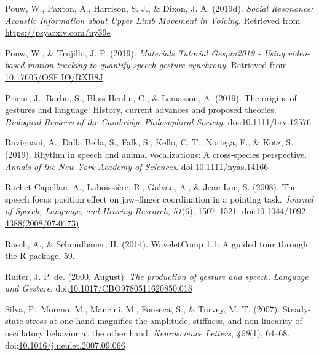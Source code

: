 \documentclass[
  man, noextraspace,floatsintext]{apa6}
\newlength{\cslhangindent}
\newenvironment{cslreferences}%
  {\setlength{\parindent}{0pt}%
  \everypar{\setlength{\hangindent}{\cslhangindent}}\ignorespaces}%
  {\par}
\begin{document}
\begin{cslreferences}
\leavevmode\hypertarget{ref-pouwSocialResonanceAcoustic2019}{}%
Pouw, W., Paxton, A., Harrison, S. J., \& Dixon, J. A. (2019d). \emph{Social Resonance: Acoustic Information about Upper Limb Movement in Voicing}. Retrieved from \url{https://psyarxiv.com/ny39e}

\leavevmode\hypertarget{ref-pouwMaterialsTutorialGespin20192019}{}%
Pouw, W., \& Trujillo, J. P. (2019). \emph{Materials Tutorial Gespin2019 - Using video-based motion tracking to quantify speech-gesture synchrony}. Retrieved from \url{10.17605/OSF.IO/RXB8J}

\leavevmode\hypertarget{ref-prieurOriginsGesturesLanguage2019}{}%
Prieur, J., Barbu, S., Blois-Heulin, C., \& Lemasson, A. (2019). The origins of gestures and language: History, current advances and proposed theories. \emph{Biological Reviews of the Cambridge Philosophical Society}. doi:\href{https://doi.org/10.1111/brv.12576}{10.1111/brv.12576}

\leavevmode\hypertarget{ref-ravignaniRhythmSpeechAnimal2019}{}%
Ravignani, A., Dalla Bella, S., Falk, S., Kello, C. T., Noriega, F., \& Kotz, S. (2019). Rhythm in speech and animal vocalizations: A cross‐species perspective. \emph{Annals of the New York Academy of Sciences}. doi:\href{https://doi.org/10.1111/nyas.14166}{10.1111/nyas.14166}

\leavevmode\hypertarget{ref-rochet-capellanSpeechFocusPosition2008}{}%
Rochet-Capellan, A., Laboissière, R., Galván, A., \& Jean-Luc, S. (2008). The speech focus position effect on jaw--finger coordination in a pointing task. \emph{Journal of Speech, Language, and Hearing Research}, \emph{51}(6), 1507--1521. doi:\href{https://doi.org/10.1044/1092-4388(2008/07-0173)}{10.1044/1092-4388(2008/07-0173)}

\leavevmode\hypertarget{ref-roschWaveletCompGuidedTour2014}{}%
Rosch, A., \& Schmidbauer, H. (2014). WaveletComp 1.1: A guided tour through the R package, 59.

\leavevmode\hypertarget{ref-ruiterProductionGestureSpeech2000}{}%
Ruiter, J. P. de. (2000, August). \emph{The production of gesture and speech}. \emph{Language and Gesture}. doi:\href{https://doi.org/10.1017/CBO9780511620850.018}{10.1017/CBO9780511620850.018}

\leavevmode\hypertarget{ref-silvaSteadystateStressOne2007}{}%
Silva, P., Moreno, M., Mancini, M., Fonseca, S., \& Turvey, M. T. (2007). Steady-state stress at one hand magnifies the amplitude, stiffness, and non-linearity of oscillatory behavior at the other hand. \emph{Neuroscience Letters}, \emph{429}(1), 64--68. doi:\href{https://doi.org/10.1016/j.neulet.2007.09.066}{10.1016/j.neulet.2007.09.066}


\end{cslreferences}
\end{document}

